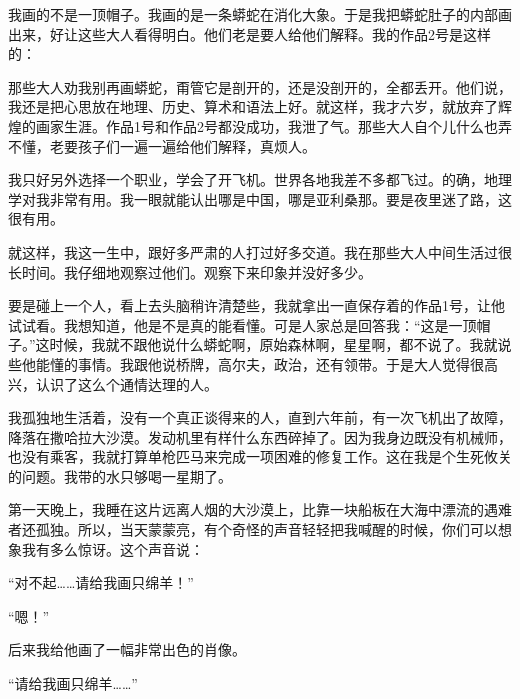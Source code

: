 我画的不是一顶帽子。我画的是一条蟒蛇在消化大象。于是我把蟒蛇肚子的内部画出来，好让这些大人看得明白。他们老是要人给他们解释。我的作品2号是这样的：

{\startalignment[center]
 \stopalignment}

那些大人劝我别再画蟒蛇，甭管它是剖开的，还是没剖开的，全都丢开。他们说，我还是把心思放在地理、历史、算术和语法上好。就这样，我才六岁，就放弃了辉煌的画家生涯。作品1号和作品2号都没成功，我泄了气。那些大人自个儿什么也弄不懂，老要孩子们一遍一遍给他们解释，真烦人。

我只好另外选择一个职业，学会了开飞机。世界各地我差不多都飞过。的确，地理学对我非常有用。我一眼就能认出哪是中国，哪是亚利桑那。要是夜里迷了路，这很有用。

就这样，我这一生中，跟好多严肃的人打过好多交道。我在那些大人中间生活过很长时间。我仔细地观察过他们。观察下来印象并没好多少。

要是碰上一个人，看上去头脑稍许清楚些，我就拿出一直保存着的作品1号，让他试试看。我想知道，他是不是真的能看懂。可是人家总是回答我：“这是一顶帽子。”这时候，我就不跟他说什么蟒蛇啊，原始森林啊，星星啊，都不说了。我就说些他能懂的事情。我跟他说桥牌，高尔夫，政治，还有领带。于是大人觉得很高兴，认识了这么个通情达理的人。


\stoptitle

\starttitle[title={2},reference={part0004.html_a005}]

我孤独地生活着，没有一个真正谈得来的人，直到六年前，有一次飞机出了故障，降落在撒哈拉大沙漠。发动机里有样什么东西碎掉了。因为我身边既没有机械师，也没有乘客，我就打算单枪匹马来完成一项困难的修复工作。这在我是个生死攸关的问题。我带的水只够喝一星期了。

第一天晚上，我睡在这片远离人烟的大沙漠上，比靠一块船板在大海中漂流的遇难者还孤独。所以，当天蒙蒙亮，有个奇怪的声音轻轻把我喊醒的时候，你们可以想象我有多么惊讶。这个声音说：

“对不起\ldots{}\ldots{}请给我画只绵羊！”

“嗯！”

{\startalignment[center]
 \stopalignment}

后来我给他画了一幅非常出色的肖像。

“请给我画只绵羊\ldots{}\ldots{}”

